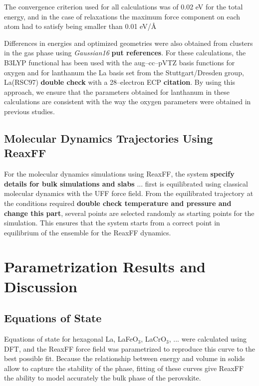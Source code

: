 \documentclass[journal=jpcafh,manuscript=article]{achemso}
\begin{document}
The convergence criterion used for all calculations was of 0.02 eV for the total energy, and in the case of relaxations the maximum force component on each atom had to satisfy being smaller than 0.01 eV/\AA 

Differences in energies and optimized geometries were also obtained from clusters in the gas phase using \emph{Gaussian16} \textbf{put references}.
For these calculations, the B3LYP functional has been used with the aug--cc--pVTZ basis functions for oxygen and for lanthanum the La basis set from the Stuttgart/Dresden group, La(RSC97) \textbf{double check} with a 28--electron ECP \textbf{citation}.
By using this approach, we ensure that the parameters obtained for lanthanum in these calculations are consistent with the way the oxygen parameters were obtained in previous studies.

\subsection{Molecular Dynamics Trajectories Using ReaxFF}
\label{sec:md-details}

For the molecular dynamics simulations using ReaxFF, the system \textbf{specify details for bulk simulations and slabs} ... first is equilibrated using classical molecular dynamics with the UFF force field.
From the equilibrated trajectory at the conditions required \textbf{double check temperature and pressure and change this part}, several points are selected randomly as starting points for the simulation.
This ensures that the system starts from a correct point in equilibrium of the ensemble for the ReaxFF dynamics.

\section{Parametrization Results and Discussion}
\label{sec:results-and-discussion}

\subsection{Equations of State}

Equations of state for hexagonal La, LaFeO$_3$, LaCrO$_3$, ... were calculated using DFT, and the ReaxFF force field was parametrized to reproduce this curve to the best possible fit.
Because the relationship between energy and volume in solids allow to capture the stability of the phase, fitting of these curves give ReaxFF the ability to model accurately the bulk phase of the perovskite.
\end{document}
